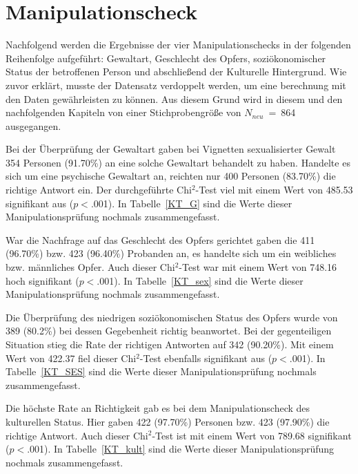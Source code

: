 \section{Manipulationscheck}    \label{sec_4.2}
Nachfolgend werden die Ergebnisse der vier Manipulationschecks in der folgenden Reihenfolge aufgeführt: Gewaltart, Geschlecht des Opfers, soziökonomischer Status der betroffenen Person und abschließend der Kulturelle Hintergrund.
Wie zuvor erklärt, musste der Datensatz verdoppelt werden, um eine berechnung mit den Daten gewährleisten zu können. Aus diesem Grund wird in diesem und den nachfolgenden Kapiteln von einer Stichprobengröße von $N_{neu}$~=~864 ausgegangen.



Bei der Überprüfung der Gewaltart gaben bei Vignetten sexualisierter Gewalt 354 Personen (91.70\%) an eine solche Gewaltart behandelt zu haben. Handelte es sich um eine psychische Gewaltart an, reichten nur 400 Personen (83.70\%) die richtige Antwort ein. Der durchgeführte Chi$^2$-Test viel mit einem Wert von 485.53 signifikant aus ($p<$.001). 
In Tabelle~\ref{KT_G} sind die Werte dieser Manipulationsprüfung nochmals zusammengefasst.

War die Nachfrage auf das Geschlecht des Opfers gerichtet gaben die 411 (96.70\%) bzw. 423 (96.40\%) Probanden an, es handelte sich um ein weibliches bzw. männliches Opfer. Auch dieser Chi$^2$-Test war mit einem Wert von 748.16 hoch signifikant ($p<$.001). 
In Tabelle~\ref{KT_sex} sind die Werte dieser Manipulationsprüfung nochmals zusammengefasst.

Die Überprüfung des niedrigen soziökonomischen Status des Opfers wurde von 389 (80.2\%) bei dessen Gegebenheit richtig beanwortet. Bei der gegenteiligen Situation stieg die Rate der richtigen Antworten auf 342 (90.20\%). Mit einem Wert von 422.37 fiel dieser Chi$^2$-Test ebenfalls signifikant aus ($p<$.001). 
In Tabelle~\ref{KT_SES} sind die Werte dieser Manipulationsprüfung nochmals zusammengefasst.



Die höchste Rate an Richtigkeit gab es bei dem Manipulationscheck des kulturellen Status. Hier gaben 422 (97.70\%) Personen bzw. 423 (97.90\%) die richtige Antwort. Auch dieser Chi$^2$-Test ist mit einem Wert von 789.68 signifikant ($p<$.001). 
In Tabelle~\ref{KT_kult} sind die Werte dieser Manipulationsprüfung nochmals zusammengefasst.





